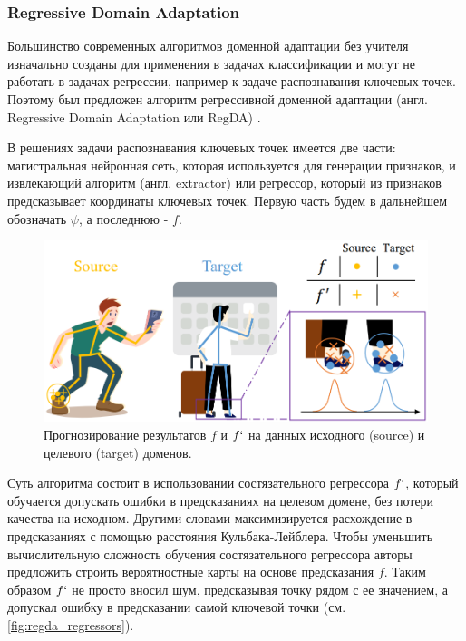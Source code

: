 \subsubsection*{Regressive Domain Adaptation}

Большинство современных алгоритмов доменной адаптации без учителя изначально созданы для применения в задачах классификации и могут не работать в задачах регрессии, например к задаче распознавания ключевых точек. Поэтому был предложен алгоритм регрессивной доменной адаптации (англ. Regressive Domain Adaptation или RegDA) \cite{regda}.

В решениях задачи распознавания ключевых точек имеется две части: магистральная нейронная сеть, которая используется для генерации признаков, и извлекающий алгоритм (англ. extractor) или регрессор, который из признаков предсказывает координаты ключевых точек. Первую часть будем в дальнейшем обозначать $\psi$, а последнюю - $f$.

\begin{figure}[h]
	\centering
	\includegraphics[width=.8\textwidth]{./images/review/regda_regressors}
	\caption{Прогнозирование результатов $f$ и $f`$ на данных исходного (source) и целевого (target) доменов. \cite{regda}}
	\label{fig:regda_regressors}
\end{figure}

Суть алгоритма состоит в использовании состязательного регрессора $f`$, который обучается допускать ошибки в предсказаниях на целевом домене, без потери качества на исходном. Другими словами максимизируется расхождение в предсказаниях с помощью расстояния Кульбака-Лейблера. Чтобы уменьшить вычислительную сложность обучения состязательного регрессора авторы предложить строить вероятностные карты на основе предсказания $f$. Таким образом $f`$ не просто вносил шум, предсказывая точку рядом с ее значением, а допускал ошибку в предсказании самой ключевой точки (см. \autoref{fig:regda_regressors}).

